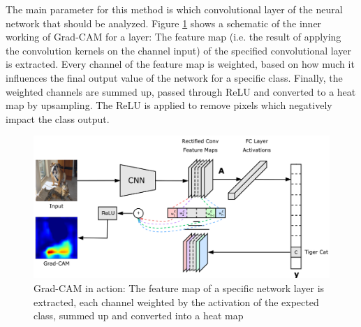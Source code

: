 The main parameter for this method is which convolutional layer of the neural network that should be analyzed. Figure \ref{grad_cam_explanation} shows a schematic of the inner working of Grad-CAM for a layer: The feature map (i.e. the result of applying the convolution kernels on the channel input) of the specified convolutional layer is extracted. Every channel of the feature map is weighted, based on how much it influences the final output value of the network for a specific class. Finally, the weighted channels are summed up, passed through ReLU and converted to a heat map by upsampling. The ReLU is applied to remove pixels which negatively impact the class output.

\begin{figure}[H]
\centering
\includegraphics[width=12cm]{chapters/02_methods/images/grad-cam.png}
\caption{Grad-CAM in action: The feature map of a specific network layer is extracted, each channel weighted by the activation of the expected class, summed up and converted into a heat map}
\label{grad_cam_explanation}
\end{figure}

